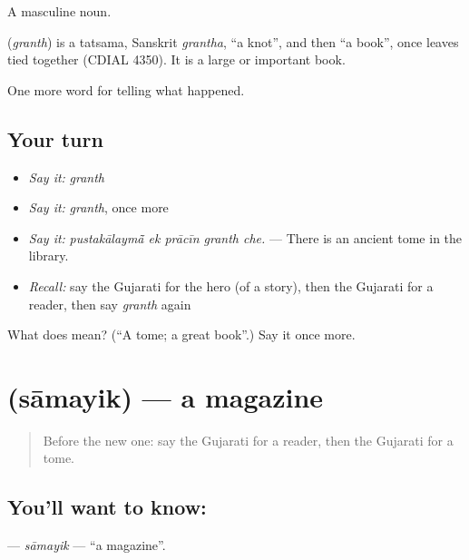 A masculine noun.

\begin{cousinweb}
\textbf{} (\emph{granth}) is a tatsama, Sanskrit \emph{grantha}, \textquotedblleft{}a knot\textquotedblright{}, and then \textquotedblleft{}a book\textquotedblright{}, once leaves tied together (CDIAL 4350). It is a large or important book.
\end{cousinweb}

\begin{grammarlens}[title={What you've built}]
One more word for telling what happened.
\end{grammarlens}

\subsection*{Your turn}
\begin{itemize}
\raggedright
  \item \emph{Say it:} \emph{granth}
  \item \emph{Say it:} \emph{granth}, once more
  \item \emph{Say it:} \emph{pustakālaymā̃ ek prācīn granth che.} — There is an ancient tome in the library.
  \item \emph{Recall:} say the Gujarati for the hero (of a story), then the Gujarati for a reader, then say \emph{granth} again
\end{itemize}

\begin{tcolorbox}[breakable,colback=teal!4,colframe=teal!35!black,title={Before you move on}]
What does  mean? (\textquotedblleft{}A tome; a great book\textquotedblright{}.) Say it once more.
\end{tcolorbox}
\section[\texorpdfstring{\gu{સામયિક} (sāmayik)}{સામયિક (sāmayik)}]{ (sāmayik) — a magazine}

\label{lesson:GU-C338-samayik}



\begin{quote}
Before the new one: say the Gujarati for a reader, then the Gujarati for a tome.
\end{quote}

\subsection*{You'll want to know: }
\textbf{} — \emph{sāmayik} — \textquotedblleft{}a magazine\textquotedblright{}.

